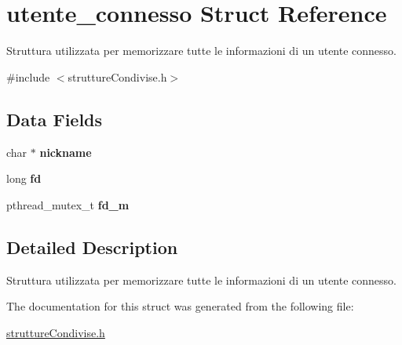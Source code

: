 \hypertarget{structutente__connesso}{}\section{utente\+\_\+connesso Struct Reference}
\label{structutente__connesso}


Struttura utilizzata per memorizzare tutte le informazioni di un utente connesso.  




{\ttfamily \#include $<$strutture\+Condivise.\+h$>$}

\subsection*{Data Fields}
\begin{DoxyCompactItemize}
\item 
\mbox{\label{structutente__connesso_aebf3fd229429c27d00bd36dea7157407}} 
char $\ast$ {\bfseries nickname}
\item 
\mbox{\label{structutente__connesso_aee8afe463d4c63384e8d090dc9d23b79}} 
long {\bfseries fd}
\item 
\mbox{\label{structutente__connesso_a954d953007cf9e679e5f94596908455b}} 
pthread\+\_\+mutex\+\_\+t {\bfseries fd\+\_\+m}
\end{DoxyCompactItemize}


\subsection{Detailed Description}
Struttura utilizzata per memorizzare tutte le informazioni di un utente connesso. 

The documentation for this struct was generated from the following file\+:\begin{DoxyCompactItemize}
\item 
\hyperlink{strutture_condivise_8h}{strutture\+Condivise.\+h}\end{DoxyCompactItemize}
